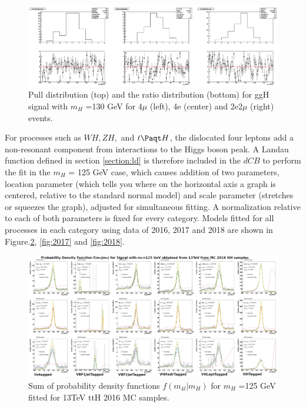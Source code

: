 \begin{figure}[h]
    \centering
    \includegraphics[scale=0.25]{images/sm2.png}
    \caption{Pull distribution (top) and the ratio distribution (bottom) for ggH signal with $m_H$ =130 GeV for 4$\mu$ (left), 4e (center) and 2e2$\mu$ (right) events.}
    \label{fig:smm2}
\end{figure}
For processes such as $WH, ZH,$ and $t\Paqt H$, the dislocated four leptons add a non-resonant component from interactions to the Higgs boson peak. A Landau function defined in section \ref{section:ld} is therefore included in the $dCB$ to perform the fit in the $m_H$ = 125 GeV case, which causes addition of two parameters, location parameter (which tells you where on the horizontal axis a graph is centered, relative to the standard normal model) and scale parameter (stretches or squeezes the graph), adjusted for simultaneous fitting. A normalization relative to each of both parameters is fixed for every category. Models fitted for all processes in each category using data of 2016, 2017 and 2018 are shown in Figure.\ref{fig:2016}, \ref{fig:2017} and \ref{fig:2018}.
\begin{figure}
    \centering
    \includegraphics[scale=1]{images/2016.jpg} 
    \caption{Sum of probability density functions $f(m_{4l} |m_H)$ for $m_H$ =125 GeV fitted for 13TeV ttH 2016 MC samples.}
    \label{fig:2016}
\end{figure}
